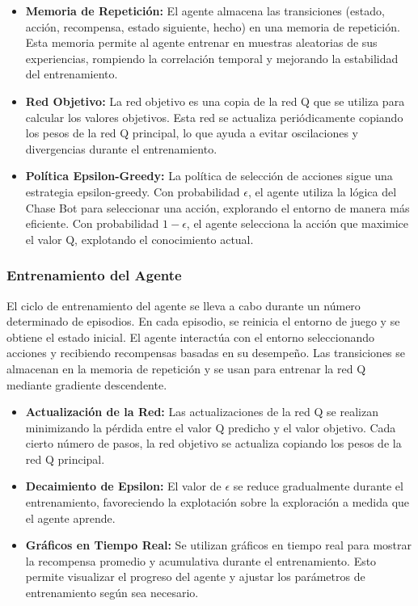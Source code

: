 \documentclass[10pt]{article}
\begin{document}
\begin{itemize}
	\item \textbf{Memoria de Repetición:} El agente almacena las transiciones (estado, acción, recompensa, estado siguiente, hecho) en una memoria de repetición. Esta memoria permite al agente entrenar en muestras aleatorias de sus experiencias, rompiendo la correlación temporal y mejorando la estabilidad del entrenamiento.
	\item \textbf{Red Objetivo:} La red objetivo es una copia de la red Q que se utiliza para calcular los valores objetivos. Esta red se actualiza periódicamente copiando los pesos de la red Q principal, lo que ayuda a evitar oscilaciones y divergencias durante el entrenamiento.
	\item \textbf{Política Epsilon-Greedy:} La política de selección de acciones sigue una estrategia epsilon-greedy. Con probabilidad \(\epsilon\), el agente utiliza la lógica del Chase Bot para seleccionar una acción, explorando el entorno de manera más eficiente. Con probabilidad \(1 - \epsilon\), el agente selecciona la acción que maximice el valor Q, explotando el conocimiento actual.
\end{itemize}

\subsubsection{Entrenamiento del Agente}

El ciclo de entrenamiento del agente se lleva a cabo durante un número determinado de episodios. En cada episodio, se reinicia el entorno de juego y se obtiene el estado inicial. El agente interactúa con el entorno seleccionando acciones y recibiendo recompensas basadas en su desempeño. Las transiciones se almacenan en la memoria de repetición y se usan para entrenar la red Q mediante gradiente descendente.

\begin{itemize}
	\item \textbf{Actualización de la Red:} Las actualizaciones de la red Q se realizan minimizando la pérdida entre el valor Q predicho y el valor objetivo. Cada cierto número de pasos, la red objetivo se actualiza copiando los pesos de la red Q principal.
	\item \textbf{Decaimiento de Epsilon:} El valor de \(\epsilon\) se reduce gradualmente durante el entrenamiento, favoreciendo la explotación sobre la exploración a medida que el agente aprende.
	\item \textbf{Gráficos en Tiempo Real:} Se utilizan gráficos en tiempo real para mostrar la recompensa promedio y acumulativa durante el entrenamiento. Esto permite visualizar el progreso del agente y ajustar los parámetros de entrenamiento según sea necesario.
\end{itemize}






\end{document}
